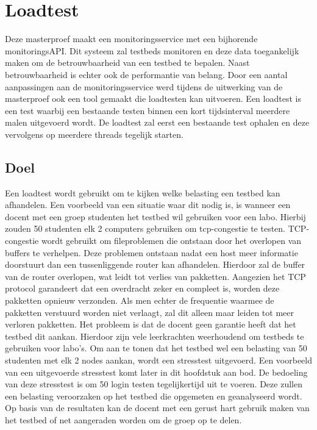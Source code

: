 \chapter{Loadtest}
{\samenvatting Deze masterproef maakt een monitoringsservice met een bijhorende monitoringsAPI. Dit systeem zal testbeds monitoren en deze data toegankelijk maken om de betrouwbaarheid van een testbed te bepalen. Naast betrouwbaarheid is echter ook de performantie van belang. Door een aantal aanpassingen aan de monitoringsservice werd tijdens de uitwerking van de masterproef ook een tool gemaakt die loadtesten kan uitvoeren. Een loadtest is een test waarbij een bestaande testen binnen een kort tijdsinterval meerdere malen uitgevoerd wordt. De loadtest zal eerst een bestaande test ophalen en deze vervolgens op meerdere threads tegelijk starten.}
\section{Doel}
\npar
Een loadtest wordt gebruikt om te kijken welke belasting een testbed kan afhandelen. Een voorbeeld van een situatie waar dit nodig is, is wanneer een docent met een groep studenten het testbed wil gebruiken voor een labo. Hierbij zouden 50 studenten elk 2 computers gebruiken om tcp-congestie te testen. TCP-congestie wordt gebruikt om fileproblemen die ontstaan door het overlopen van buffers te verhelpen. Deze problemen ontstaan nadat een host meer informatie doorstuurt dan een tussenliggende router kan afhandelen. Hierdoor zal de buffer van de router overlopen, wat leidt tot verlies van pakketten. Aangezien het TCP protocol garandeert dat een overdracht zeker en compleet is, worden deze pakketten opnieuw verzonden. Als men echter de frequentie waarmee de pakketten verstuurd worden niet verlaagt, zal dit alleen maar leiden tot meer verloren pakketten.
\clearpage
\npar
Het probleem is dat de docent geen garantie heeft dat het testbed dit aankan. Hierdoor zijn vele leerkrachten weerhoudend om testbeds te gebruiken voor labo's.
Om aan te tonen dat het testbed wel een belasting van 50 studenten met elk 2 nodes aankan, wordt een stresstest uitgevoerd. Een voorbeeld van een uitgevoerde stresstest komt later in dit hoofdstuk aan bod. De bedoeling van deze stresstest is om 50 login testen tegelijkertijd uit te voeren. Deze zullen een belasting veroorzaken op het testbed die opgemeten en geanalyseerd wordt. Op basis van de resultaten kan de docent met een gerust hart gebruik maken van het testbed of net aangeraden worden om de groep op te delen.
